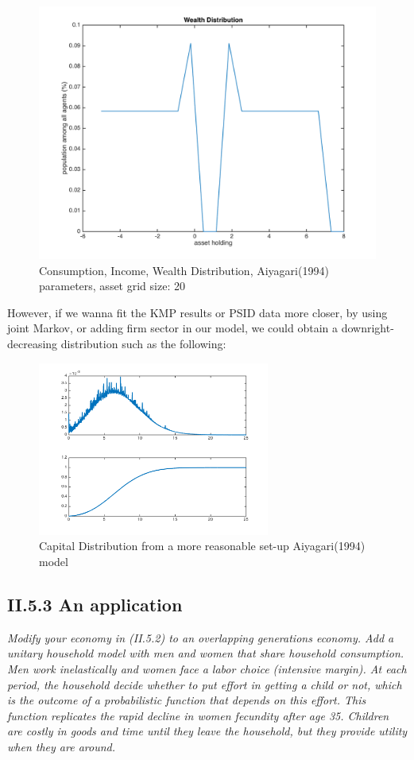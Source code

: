 \documentclass{article}[a4paper]
\begin{document}
\begin{figure}[htbp]
\begin{minipage}[t]{0.48\textwidth}
\centering
\includegraphics[width=\textwidth]{img/1wealthdist.png}
\end{minipage}
\caption{Consumption, Income, Wealth Distribution, Aiyagari(1994) parameters, asset grid size: 20}
\end{figure}

However, if we wanna fit the KMP results or PSID data more closer, by using joint Markov, or adding firm sector in our model, we could obtain a downright-decreasing distribution such as the following:

\begin{figure}[htbp]
\centering
\includegraphics[width=0.68\textwidth]{img/1111.png}
\caption{Capital Distribution from a more reasonable set-up Aiyagari(1994) model}
\end{figure}

\pagebreak
\subsection{II.5.3 An application}
\textit{Modify your economy in (II.5.2) to an overlapping generations economy. Add a unitary household model with men and women that share household consumption. Men work inelastically and women face a labor choice (intensive margin). At each period, the household decide whether to put effort in getting a child or not, which is the outcome of a probabilistic function that depends on this effort. This function replicates the rapid decline in women fecundity after age 35. Children are costly in goods and time until they leave the household, but they provide utility when they are around.}
\end{document}

